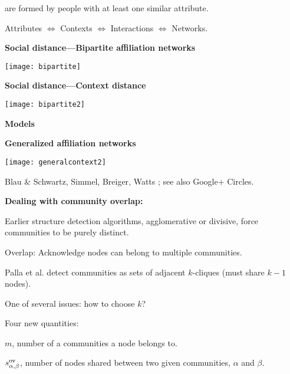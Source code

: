   \bigskip

  {
     are formed by people with at least one similar attribute.
  }

  \bigskip

  {
    Attributes $\Leftrightarrow$ 
    Contexts $\Leftrightarrow$ 
    Interactions $\Leftrightarrow$ 
    Networks.
    }
  


  \textbf{Social distance---Bipartite affiliation networks}

  
  \centering
  \texttt{[image: bipartite]}
  



  \textbf{Social distance---Context distance}

  
    \centering
    \texttt{[image: bipartite2]}
  


  \textbf{Models}

  \textbf{Generalized affiliation networks}

    \medskip

    \texttt{[image: generalcontext2]}  
    
     Blau \& Schwartz\cite{blau1984a}, Simmel\cite{simmel1902a},
      Breiger\cite{breiger1974a}, Watts \etal\cite{watts2002b}; 
      see also Google+ Circles.
    
  






  \textbf{Dealing with community overlap:}
    
    
      Earlier structure detection algorithms, agglomerative or divisive, force
      communities to be purely distinct.
    
      Overlap: Acknowledge nodes can belong to multiple communities.
    
      Palla et al.\cite{palla2005a} detect communities as sets of adjacent
      $k$-cliques (must share $k-1$ nodes).
    
      One of several issues: how to choose $k$?
    
      Four new quantities:
      
      
        $m$, number of a communities a node belongs to.
      
        $s_{\alpha,\beta}^{\textnormal{ov}}$, number of nodes 
        shared between
        two given communities, $\alpha$ and $\beta$.
      
